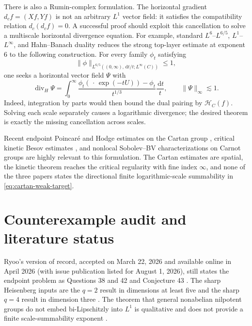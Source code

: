 \documentclass[11pt]{article}
\theoremstyle{definition}
\theoremstyle{remark}
\newcommand{\dd}{\,\mathrm d}
\newcommand{\norm}[1]{\lVert #1\rVert}
\newcommand{\HH}{\mathcal H}
\newcommand{\less}{\lesssim}
\begin{document}
There is also a Rumin-complex formulation.  The horizontal gradient
\(d_cf=(Xf,Yf)\) is not an arbitrary \(L^1\) vector field: it satisfies the compatibility
relation \(d_c(d_cf)=0\).  A successful proof should exploit this cancellation to solve a
multiscale horizontal divergence equation.  For example, standard
\(L^6\)--\(L^{6/5}\), \(L^1\)--\(L^\infty\), and Hahn--Banach duality reduces the strong
top-layer estimate at exponent \(6\) to the following construction.  For every family
\(\phi_t\) satisfying
\[
 \norm{\phi}_{L^{6/5}((0,\infty),\dd t/t;L^\infty(C))}\le1,
\]
one seeks a horizontal vector field \(\Psi\) with
\begin{equation}\label{eq:dual}
 \operatorname{div}_H\Psi
 =\int_0^\infty
 \frac{\phi_t(\,\cdot\,\exp(-tU))-\phi_t}{t^{1/3}}\frac{\dd t}{t},
 \qquad \norm{\Psi}_\infty\less1.
\end{equation}
Indeed, integration by parts would then bound the dual pairing by \(\HH_C(f)\).  Solving
each scale separately causes a logarithmic divergence; the desired theorem is exactly the
missing cancellation across scales.

Recent endpoint Poincar\'e and Hodge estimates on the Cartan group
\cite{BaldiRosa2026}, critical kinetic Besov estimates \cite{Niebel2026}, and nonlocal
Sobolev--BV characterizations on Carnot groups \cite{SerraCassanoZambanini2026} are
highly relevant to this formulation.  The Cartan estimates are spatial, the kinetic theorem
reaches the critical regularity with fine index \(\infty\), and none of the three papers
states the directional finite logarithmic-scale summability in
\eqref{eq:cartan-weak-target}.

\section{Counterexample audit and literature status}\label{sec:literature}

Ryoo's version of record, accepted on March 22, 2026 and available online in April
2026 (with issue publication listed for August 1, 2026), still states the endpoint problem
as Questions 38 and 42 and Conjecture 43
\cite{Ryoo2026}.  The sharp Heisenberg inputs are the \(q=2\) result in dimensions at
least five \cite{NaorYoung2018} and the sharp \(q=4\) result in dimension three
\cite{NaorYoung2022}.  The theorem that general nonabelian nilpotent groups do not
embed bi-Lipschitzly into \(L^1\) is qualitative and does not provide a finite
scale-summability exponent \cite{EBGLD2023}.
\end{document}
